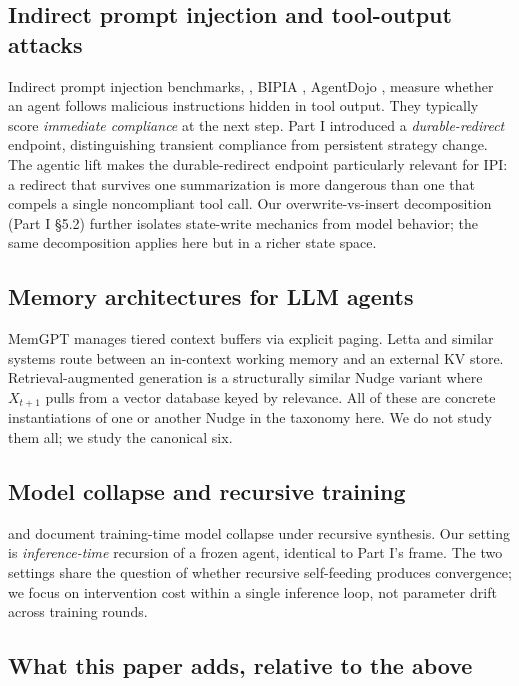 \documentclass{article}
\theoremstyle{plain}
\theoremstyle{definition}
\begin{document}
\subsection{Indirect prompt injection and tool-output attacks}

Indirect prompt injection benchmarks, \citet{arxiv230212173}, BIPIA \citep{arxiv231214197}, AgentDojo \citep{arxiv240613352}, measure whether an agent follows malicious instructions hidden in tool output. They typically score \textit{immediate compliance} at the next step. Part I introduced a \textit{durable-redirect} endpoint, distinguishing transient compliance from persistent strategy change. The agentic lift makes the durable-redirect endpoint particularly relevant for IPI: a redirect that survives one summarization is more dangerous than one that compels a single noncompliant tool call. Our overwrite-vs-insert decomposition (Part I §5.2) further isolates state-write mechanics from model behavior; the same decomposition applies here but in a richer state space.

\subsection{Memory architectures for LLM agents}

MemGPT \citep{arxiv231008560} manages tiered context buffers via explicit paging. Letta and similar systems route between an in-context working memory and an external KV store. Retrieval-augmented generation is a structurally similar Nudge variant where $X_{t+1}$ pulls from a vector database keyed by relevance. All of these are concrete instantiations of one or another Nudge in the taxonomy here. We do not study them all; we study the canonical six.

\subsection{Model collapse and recursive training}

\citet{shumailov2024} and \citet{arxiv230701850} document training-time model collapse under recursive synthesis. Our setting is \textit{inference-time} recursion of a frozen agent, identical to Part I's frame. The two settings share the question of whether recursive self-feeding produces convergence; we focus on intervention cost within a single inference loop, not parameter drift across training rounds.

\subsection{What this paper adds, relative to the above}
\end{document}
